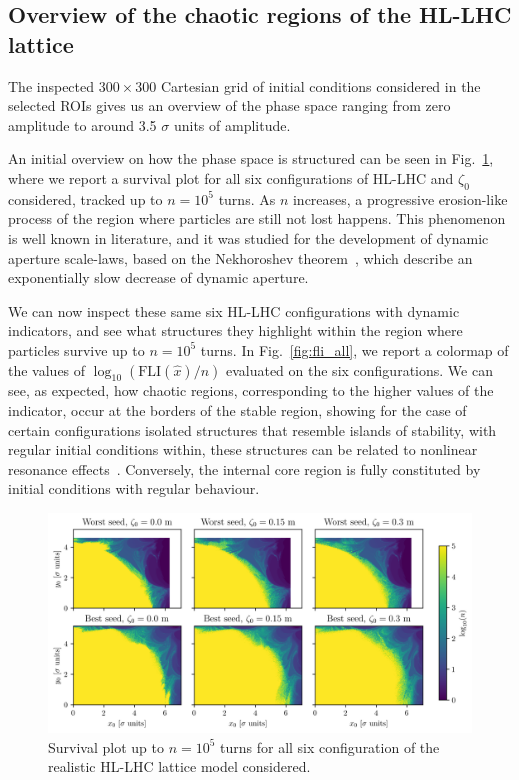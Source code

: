 \subsection{Overview of the chaotic regions of the HL-LHC lattice}

The inspected $300\times300$ Cartesian grid of initial conditions considered in the selected ROIs gives us an overview of the phase space ranging from zero amplitude to around 3.5 $\sigma$ units of amplitude.

An initial overview on how the phase space is structured can be seen in Fig.~\ref{fig:true_survivors}, where we report a survival plot for all six configurations of HL-LHC and $\zeta_0$ considered, tracked up to $n=10^5$ turns. As $n$ increases, a progressive erosion-like process of the region where particles are still not lost happens. This phenomenon is well known in literature, and it was studied for the development of dynamic aperture scale-laws, based on the Nekhoroshev theorem~\cite{}, which describe an exponentially slow decrease of dynamic aperture.

We can now inspect these same six HL-LHC configurations with dynamic indicators, and see what structures they highlight within the region where particles survive up to $n=10^5$ turns. In Fig.~\ref{fig:fli_all}, we report a colormap of the values of $\log_{10}(\mathrm{FLI}(\hat{x})/n)$ evaluated on the six configurations. We can see, as expected, how chaotic regions, corresponding to the higher values of the indicator, occur at the borders of the stable region, showing for the case of certain configurations isolated structures that resemble islands of stability, with regular initial conditions within, these structures can be related to nonlinear resonance effects~\cite{}. Conversely, the internal core region is fully constituted by initial conditions with regular behaviour.

\begin{figure}
    \centering
    \includegraphics[width=1.0\textwidth]{6_lhc_dynamic_indicators/figs/stability.png}
    \caption{Survival plot up to $n=10^5$ turns for all six configuration of the realistic HL-LHC lattice model considered.}
    \label{fig:true_survivors}
\end{figure}

